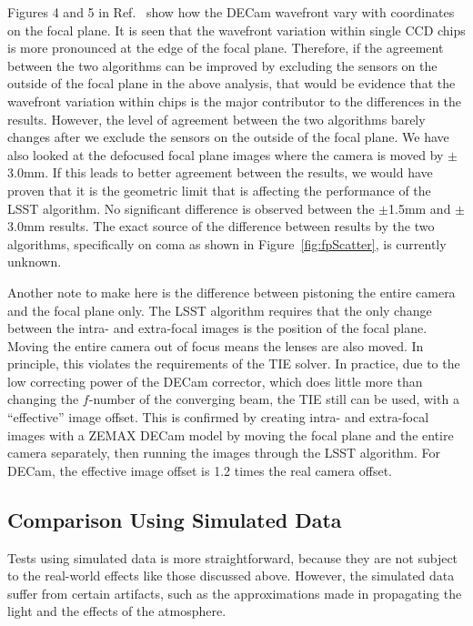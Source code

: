 \documentclass[]{spie}  %
\begin{document}
Figures 4 and 5 in Ref.~ show how the DECam wavefront vary with coordinates on
the focal plane. It is seen that the wavefront variation within single CCD chips 
is more pronounced at the edge of
the focal plane. Therefore, if the agreement between the two algorithms can be improved by excluding the sensors on the outside of the focal plane in the above analysis, 
that would be evidence that the wavefront variation within chips is the major contributor to the 
differences in the results.
However, the level of agreement between the two algorithms barely changes
after we exclude the sensors on the outside of the focal plane.
We have also looked at the defocused focal plane images where the camera is moved by $\pm$3.0mm.
If this leads to better agreement between the results, we would have proven that
it is the geometric limit that is affecting the performance of the LSST algorithm.
No significant difference is observed between the $\pm$1.5mm and $\pm$3.0mm results.
The exact source of the difference between results by the two algorithms, 
specifically on coma as shown in Figure~\ref{fig:fpScatter}, is currently unknown.

Another note to make here is the difference between pistoning the entire camera and the focal plane only.
The LSST algorithm requires that the only change between the intra- and extra-focal images is the position of the focal plane. Moving the entire camera out of focus means the lenses are also moved. In principle, this violates the requirements of the TIE solver.
In practice, due to the low correcting power of the DECam corrector, which does little more than changing the $f$-number of the converging beam, the TIE still can be used, with a ``effective'' image offset.
This is confirmed by creating intra- and extra-focal images with a ZEMAX DECam model by moving the focal plane and the entire camera separately, then running the images through the LSST algorithm.
For DECam, the effective image offset is 1.2 times the real camera offset.

\subsection{Comparison Using Simulated Data}

Tests using simulated data is more straightforward, because they are not subject to the real-world effects like those discussed above. However, the simulated data suffer from certain artifacts, such as the approximations made in propagating the light and the effects of the atmosphere.
		  
\end{document}
